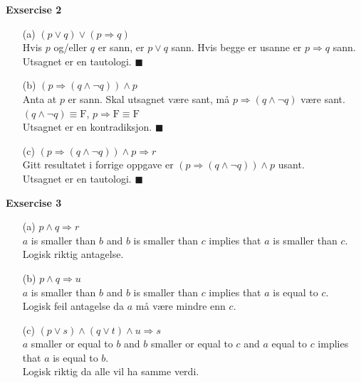 \documentclass[a4paper, 12pt]{article}  %
\begin{document}
\newpage
\textbf{Exsercise 2}
\begin{enumerate}
    \item [(a)] $(p \lor q) \lor (p \Rightarrow q)$
          \\Hvis $p$ og/eller $q$ er sann, er $p \lor q$ sann. Hvis begge er usanne er $p \Rightarrow q$ sann.
          \\Utsagnet er en tautologi. $\blacksquare$

    \item [(b)] $\left( p \Rightarrow (q \land \neg q) \right) \land p$
          \\Anta at $p$ er sann. Skal utsagnet være sant, må $p \Rightarrow (q \land \neg q)$ være sant.
          \\ $(q \land \neg q) \equiv \mathrm{F}$, $p \Rightarrow \mathrm{F} \equiv \mathrm{F}$
          \\Utsagnet er en kontradiksjon. $\blacksquare$

    \item [(c)] $\left( p \Rightarrow (q \land \neg q) \right) \land p \Rightarrow r$
          \\Gitt resultatet i forrige oppgave er $\left( p \Rightarrow (q \land \neg q) \right) \land p$ usant.
          \\Utsagnet er en tautologi. $\blacksquare$
\end{enumerate}

\textbf{Exsercise 3}
\begin{enumerate}
    \item [(a)] $p \land q \Rightarrow r$
          \\$a$ is smaller than $b$ and $b$ is smaller than $c$ implies that $a$ is smaller than $c$.
          \\Logisk riktig antagelse.
    \item [(b)] $p \land q \Rightarrow u$
          \\$a$ is smaller than $b$ and $b$ is smaller than $c$ implies that $a$ is equal to $c$.
              \\Logisk feil antagelse da $a$ må være mindre enn $c$.
    \item [(c)] $(p \lor s) \land (q \lor t) \land u \Rightarrow s$
          \\$a$ smaller or equal to $b$ and $b$ smaller or equal to $c$ and $a$ equal to $c$ implies that $a$ is equal to $b$.
          \\Logisk riktig da alle vil ha samme verdi.
\end{enumerate}
\end{document}
